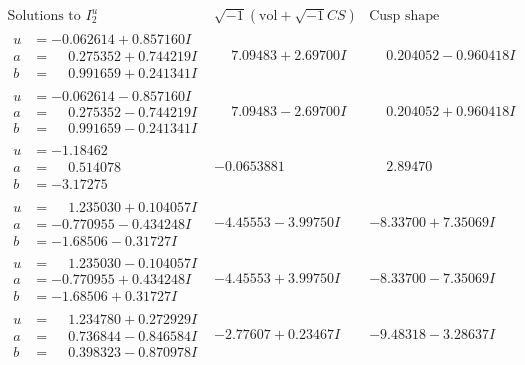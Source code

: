 \documentclass[1p]{elsarticle_modified}
\theoremstyle{definition}
\newcommand{\I}{\sqrt{-1}}
\begin{document}
$$\begin{array}{c|c|c}  
\text{Solutions to }I^u_{2}& \I (\text{vol} + \sqrt{-1}CS) & \text{Cusp shape}\\
 \hline 
\begin{aligned}
u &= -0.062614 + 0.857160 I \\
a &= \phantom{-}0.275352 + 0.744219 I \\
b &= \phantom{-}0.991659 + 0.241341 I\end{aligned}
 & \phantom{-}7.09483 + 2.69700 I & \phantom{-}0.204052 - 0.960418 I \\ \hline\begin{aligned}
u &= -0.062614 - 0.857160 I \\
a &= \phantom{-}0.275352 - 0.744219 I \\
b &= \phantom{-}0.991659 - 0.241341 I\end{aligned}
 & \phantom{-}7.09483 - 2.69700 I & \phantom{-}0.204052 + 0.960418 I \\ \hline\begin{aligned}
u &= -1.18462\phantom{ +0.000000I} \\
a &= \phantom{-}0.514078\phantom{ +0.000000I} \\
b &= -3.17275\phantom{ +0.000000I}\end{aligned}
 & -0.0653881\phantom{ +0.000000I} & \phantom{-}2.89470\phantom{ +0.000000I} \\ \hline\begin{aligned}
u &= \phantom{-}1.235030 + 0.104057 I \\
a &= -0.770955 - 0.434248 I \\
b &= -1.68506 - 0.31727 I\end{aligned}
 & -4.45553 - 3.99750 I & -8.33700 + 7.35069 I \\ \hline\begin{aligned}
u &= \phantom{-}1.235030 - 0.104057 I \\
a &= -0.770955 + 0.434248 I \\
b &= -1.68506 + 0.31727 I\end{aligned}
 & -4.45553 + 3.99750 I & -8.33700 - 7.35069 I \\ \hline\begin{aligned}
u &= \phantom{-}1.234780 + 0.272929 I \\
a &= \phantom{-}0.736844 - 0.846584 I \\
b &= \phantom{-}0.398323 - 0.870978 I\end{aligned}
 & -2.77607 + 0.23467 I & -9.48318 - 3.28637 I \\ \hline\begin{aligned}

\end{aligned}
\end{array}$$
\end{document}
